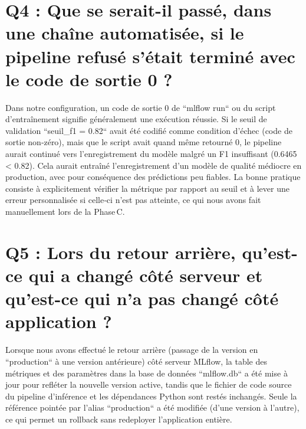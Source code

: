\documentclass[12pt,a4paper]{report}
\begin{document}
\section{Q4 : Que se serait-il passé, dans une chaîne automatisée, si le pipeline refusé s'était terminé avec le code de sortie 0 ?}
Dans notre configuration, un code de sortie 0 de ``mlflow run`` ou du script d'entraînement signifie généralement une exécution réussie. Si le seuil de validation ``seuil\_f1 = 0.82`` avait été codifié comme condition d'échec (code de sortie non‑zéro), mais que le script avait quand même retourné 0, le pipeline aurait continué vers l'enregistrement du modèle malgré un F1 insuffisant (0.6465 < 0.82). Cela aurait entraîné l'enregistrement d'un modèle de qualité médiocre en production, avec pour conséquence des prédictions peu fiables. La bonne pratique consiste à explicitement vérifier la métrique par rapport au seuil et à lever une erreur personnalisée si celle‑ci n'est pas atteinte, ce qui nous avons fait manuellement lors de la Phase C.

\section{Q5 : Lors du retour arrière, qu'est-ce qui a changé côté serveur et qu'est-ce qui n'a pas changé côté application ?}
Lorsque nous avons effectué le retour arrière (passage de la version en ``production`` à une version antérieure) côté serveur MLflow, la table des métriques et des paramètres dans la base de données ``mlflow.db`` a été mise à jour pour refléter la nouvelle version active, tandis que le fichier de code source du pipeline d'inférence et les dépendances Python sont restés inchangés. Seule la référence pointée par l'alias ``production`` a été modifiée (d'une version à l'autre), ce qui permet un rollback sans redeployer l'application entière.
\end{document}
